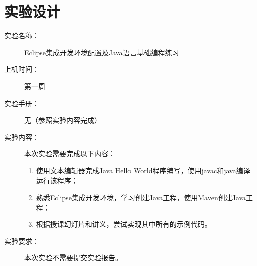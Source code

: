 \chapter*{实验设计}
\sline

\begin{description}
\item[实验名称：] Eclipse集成开发环境配置及Java语言基础编程练习
\item[上机时间：] 第一周
\item[实验手册：] 无（参照实验内容完成）
\item[实验内容：] 本次实验需要完成以下内容：
  \begin{enumerate}
  \item 使用文本编辑器完成Java Hello World程序编写，使用javac和java编译运行该程序；
  \item 熟悉Eclipse集成开发环境，学习创建Java工程，使用Maven创建Java工程；
  \item 根据授课幻灯片和讲义，尝试实现其中所有的示例代码。
  \end{enumerate}
  
\item[实验要求：] 本次实验不需要提交实验报告。
\end{description}